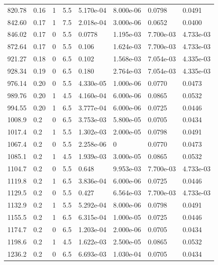 \documentclass[preview]{standalone}
\begin{document}
{{{\begin{tabular}{L{1.2cm}C{1.2cm} C{0.3cm}C{0.5cm} C{1.4cm}C{1.4cm} C{1.4cm}C{1.4cm}}
  820.78  &  0.16  & 1     & 5.5 &  5.170e-04  & 8.000e-06  & 0.0798 &  0.0491   \\ 
  842.60  &  0.17  & 1     & 7.5 &  2.018e-04  & 3.000e-06  & 0.0652 &  0.0400   \\ 
  846.02  &  0.17  & 0     & 5.5 &  0.0778  & 1.195e-03  & 7.700e-03 &  4.733e-03   \\ 
  872.64  &  0.17  & 0     & 5.5 &  0.106  & 1.624e-03  & 7.700e-03 &  4.733e-03   \\ 
  921.27  &  0.18  & 0     & 6.5 &  0.102  & 1.568e-03  & 7.054e-03 &  4.335e-03   \\ 
  928.34  &  0.19  & 0     & 6.5 &  0.180  & 2.764e-03  & 7.054e-03 &  4.335e-03   \\ 
  976.14  &  0.20  & 0     & 5.5 &  4.330e-05  & 1.000e-06  & 0.0770 &  0.0473   \\ 
  989.76  &  0.20  & 1     & 4.5 &  4.160e-04  & 6.000e-06  & 0.0865 &  0.0532   \\ 
  994.55  &  0.20  & 1     & 6.5 &  3.777e-04  & 6.000e-06  & 0.0725 &  0.0446   \\ 
  1008.9  &   0.2  & 0     & 6.5 &  3.753e-03  & 5.800e-05  & 0.0705 &  0.0434   \\ 
  1017.4  &   0.2  & 1     & 5.5 &  1.302e-03  & 2.000e-05  & 0.0798 &  0.0491   \\ 
  1067.4  &   0.2  & 0     & 5.5 &  2.258e-06  & 0  & 0.0770 &  0.0473   \\ 
  1085.1  &   0.2  & 1     & 4.5 &  1.939e-03  & 3.000e-05  & 0.0865 &  0.0532   \\ 
  1104.7  &   0.2  & 0     & 5.5 &  0.648  & 9.953e-03  & 7.700e-03 &  4.733e-03   \\ 
  1119.8  &   0.2  & 1     & 6.5 &  3.836e-04  & 6.000e-06  & 0.0725 &  0.0446   \\ 
  1129.5  &   0.2  & 0     & 5.5 &  0.427  & 6.564e-03  & 7.700e-03 &  4.733e-03   \\ 
  1132.9  &   0.2  & 1     & 5.5 &  5.292e-04  & 8.000e-06  & 0.0798 &  0.0491   \\ 
  1155.5  &   0.2  & 1     & 6.5 &  6.315e-04  & 1.000e-05  & 0.0725 &  0.0446   \\ 
  1174.7  &   0.2  & 0     & 6.5 &  1.203e-04  & 2.000e-06  & 0.0705 &  0.0434   \\ 
  1198.6  &   0.2  & 1     & 4.5 &  1.622e-03  & 2.500e-05  & 0.0865 &  0.0532   \\ 
  1236.2  &   0.2  & 0     & 6.5 &  6.693e-03  & 1.030e-04  & 0.0705 &  0.0434   \\ 

\end{tabular}}}}
\end{document}

